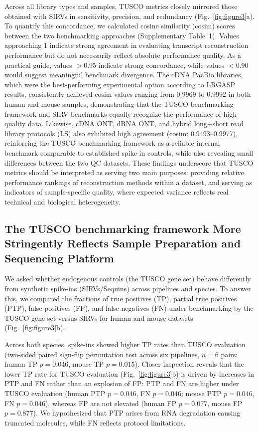 \documentclass[pdflatex,sn-nature]{sn-jnl}%
\newcommand{\tuscoGeneSet}{TUSCO gene set}
\newcommand{\tuscoBenchmarkingFramework}{TUSCO benchmarking framework}
\newcommand{\tuscoEvaluation}{TUSCO evaluation}
\newcommand{\tuscoMetrics}{TUSCO metrics}
\begin{document}
Across all library types and samples, \tuscoMetrics{} closely mirrored those obtained with SIRVs in sensitivity, precision, and redundancy (Fig.~\ref{fig:figure3}a). To quantify this concordance, we calculated cosine similarity (cosim) scores between the two benchmarking approaches (Supplementary Table~1). Values approaching 1 indicate strong agreement in evaluating transcript reconstruction performance but do not necessarily reflect absolute performance quality. As a practical guide, values $>$0.95 indicate strong concordance, while values $<$0.90 would suggest meaningful benchmark divergence. The cDNA PacBio libraries, which were the best-performing experimental option according to LRGASP results, consistently achieved cosim values ranging from 0.9969 to 0.9992 in both human and mouse samples, demonstrating that the \tuscoBenchmarkingFramework{} and SIRV benchmarks equally recognize the performance of high-quality data. Likewise, cDNA ONT, dRNA ONT, and hybrid long+short read library protocols (LS) also exhibited high agreement (cosim: 0.9493--0.9977), reinforcing the \tuscoBenchmarkingFramework{} as a reliable internal benchmark comparable to established spike-in controls, while also revealing small differences between the two QC datasets. These findings underscore that \tuscoMetrics{} should be interpreted as serving two main purposes: providing relative performance rankings of reconstruction methods within a dataset, and serving as indicators of sample-specific quality, where expected variance reflects real technical and biological heterogeneity.

\subsection{The \tuscoBenchmarkingFramework{} More Stringently Reflects Sample Preparation and Sequencing Platform}

We asked whether endogenous controls (the \tuscoGeneSet{}) behave differently from synthetic spike-ins (SIRVs/Sequins) across pipelines and species. To answer this, we compared the fractions of true positives (TP), partial true positives (PTP), false positives (FP), and false negatives (FN) under benchmarking by the \tuscoGeneSet{} versus SIRVs for human and mouse datasets (Fig.~\ref{fig:figure3}b).

Across both species, spike-ins showed higher TP rates than \tuscoEvaluation{} (two-sided paired sign-flip permutation test across six pipelines, $n=6$ pairs; human TP $p=0.046$, mouse TP $p=0.015$). Closer inspection reveals that the lower TP rate for \tuscoEvaluation{} (Fig.~\ref{fig:figure3}b) is driven by increases in PTP and FN rather than an explosion of FP: PTP and FN are higher under \tuscoEvaluation{} (human PTP $p=0.046$, FN $p=0.046$; mouse PTP $p=0.046$, FN $p=0.046$), whereas FP are not elevated (human FP $p=0.077$, mouse FP $p=0.877$). We hypothesized that PTP arises from RNA degradation causing truncated molecules, while FN reflects protocol limitations.
\end{document}
